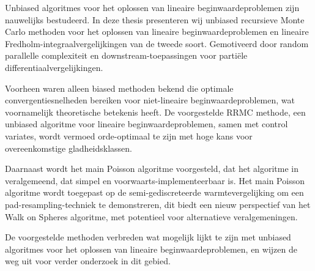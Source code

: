 Unbiased algoritmes voor het oplossen van lineaire beginwaardeproblemen zijn
nauwelijks bestudeerd.
In deze thesis presenteren wij unbiased recursieve Monte Carlo methoden
voor het oplossen van lineaire beginwaardeproblemen en lineaire Fredholm-integraalvergelijkingen
van de tweede soort. Gemotiveerd door random
parallelle complexiteit en downstream-toepassingen voor partiële differentiaalvergelijkingen.

Voorheen waren alleen biased methoden bekend die optimale convergentiesnelheden bereiken
voor niet-lineaire beginwaardeproblemen, wat voornamelijk theoretische betekenis heeft.
De voorgestelde RRMC methode, een unbiased algoritme voor lineaire beginwaardeproblemen,
samen met control variates, wordt vermoed orde-optimaal te zijn met hoge kans
voor overeenkomstige gladheidsklassen.

Daarnaast wordt het main Poisson algoritme voorgesteld, dat het algoritme in \cite{acebron_monte_2016} veralgemeend,
dat simpel en voorwaarts-implementeerbaar is. Het main Poisson algoritme wordt toegepast op de semi-gediscreteerde
warmtevergelijking om een pad-resampling-techniek te demonstreren, dit biedt een nieuw perspectief van
het Walk on Spheres algoritme,
met potentieel voor alternatieve veralgemeningen.

De voorgestelde methoden verbreden
wat mogelijk lijkt te zijn met unbiased algoritmes voor
het oplossen van lineaire beginwaardeproblemen,
en wijzen de weg uit voor verder onderzoek in dit gebied.